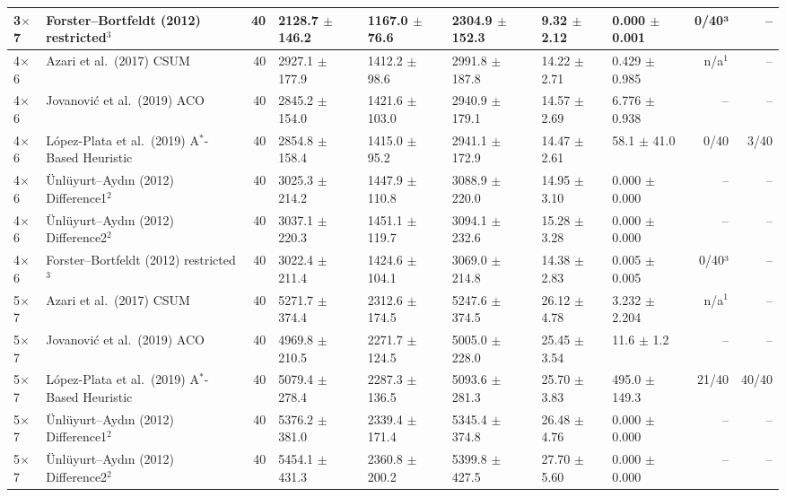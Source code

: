 \begin{table}[htbp]
\begin{tabular}{llrlllllrr}
3$\times$7 & Forster--Bortfeldt (2012) restricted$^{3}$ & 40 & 2128.7 $\pm$ 146.2 & 1167.0 $\pm$ 76.6 & 2304.9 $\pm$ 152.3 & 9.32 $\pm$ 2.12 & 0.000 $\pm$ 0.001 & 0/40³ & -- \\
\midrule
4$\times$6 & Azari et al.\ (2017) CSUM & 40 & 2927.1 $\pm$ 177.9 & 1412.2 $\pm$ 98.6 & 2991.8 $\pm$ 187.8 & 14.22 $\pm$ 2.71 & 0.429 $\pm$ 0.985 & n/a$^{1}$ & -- \\
4$\times$6 & Jovanovi\'{c} et al.\ (2019) ACO & 40 & 2845.2 $\pm$ 154.0 & 1421.6 $\pm$ 103.0 & 2940.9 $\pm$ 179.1 & 14.57 $\pm$ 2.69 & 6.776 $\pm$ 0.938 & -- & -- \\
4$\times$6 & L\'{o}pez-Plata et al.\ (2019) A$^\ast$-Based Heuristic & 40 & 2854.8 $\pm$ 158.4 & 1415.0 $\pm$ 95.2 & 2941.1 $\pm$ 172.9 & 14.47 $\pm$ 2.61 & 58.1 $\pm$ 41.0 & 0/40 & 3/40 \\
4$\times$6 & \"{U}nl\"{u}yurt--Ayd\i{}n (2012) Difference1$^{2}$ & 40 & 3025.3 $\pm$ 214.2 & 1447.9 $\pm$ 110.8 & 3088.9 $\pm$ 220.0 & 14.95 $\pm$ 3.10 & 0.000 $\pm$ 0.000 & -- & -- \\
4$\times$6 & \"{U}nl\"{u}yurt--Ayd\i{}n (2012) Difference2$^{2}$ & 40 & 3037.1 $\pm$ 220.3 & 1451.1 $\pm$ 119.7 & 3094.1 $\pm$ 232.6 & 15.28 $\pm$ 3.28 & 0.000 $\pm$ 0.000 & -- & -- \\
4$\times$6 & Forster--Bortfeldt (2012) restricted$^{3}$ & 40 & 3022.4 $\pm$ 211.4 & 1424.6 $\pm$ 104.1 & 3069.0 $\pm$ 214.8 & 14.38 $\pm$ 2.83 & 0.005 $\pm$ 0.005 & 0/40³ & -- \\
\midrule
5$\times$7 & Azari et al.\ (2017) CSUM & 40 & 5271.7 $\pm$ 374.4 & 2312.6 $\pm$ 174.5 & 5247.6 $\pm$ 374.5 & 26.12 $\pm$ 4.78 & 3.232 $\pm$ 2.204 & n/a$^{1}$ & -- \\
5$\times$7 & Jovanovi\'{c} et al.\ (2019) ACO & 40 & 4969.8 $\pm$ 210.5 & 2271.7 $\pm$ 124.5 & 5005.0 $\pm$ 228.0 & 25.45 $\pm$ 3.54 & 11.6 $\pm$ 1.2 & -- & -- \\
5$\times$7 & L\'{o}pez-Plata et al.\ (2019) A$^\ast$-Based Heuristic & 40 & 5079.4 $\pm$ 278.4 & 2287.3 $\pm$ 136.5 & 5093.6 $\pm$ 281.3 & 25.70 $\pm$ 3.83 & 495.0 $\pm$ 149.3 & 21/40 & 40/40 \\
5$\times$7 & \"{U}nl\"{u}yurt--Ayd\i{}n (2012) Difference1$^{2}$ & 40 & 5376.2 $\pm$ 381.0 & 2339.4 $\pm$ 171.4 & 5345.4 $\pm$ 374.8 & 26.48 $\pm$ 4.76 & 0.000 $\pm$ 0.000 & -- & -- \\
5$\times$7 & \"{U}nl\"{u}yurt--Ayd\i{}n (2012) Difference2$^{2}$ & 40 & 5454.1 $\pm$ 431.3 & 2360.8 $\pm$ 200.2 & 5399.8 $\pm$ 427.5 & 27.70 $\pm$ 5.60 & 0.000 $\pm$ 0.000 & -- & -- \\

\end{tabular}
\end{table}
